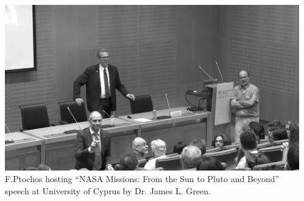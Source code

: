 \begin{columns}[T]
  \begin{column}{0.66\textwidth}
    
  \end{column}
  \begin{column}{0.33\textwidth}
    
    \vspace{0.3cm}
    \includegraphics[width=1.0\textwidth]{./figures/nasa.jpg}
    F.Ptochos hosting ``NASA Missions: From the Sun to Pluto and Beyond'' speech at University of Cyprus by Dr. James L. Green.
    
  \end{column}
\end{columns}

\vspace{0.3cm}

